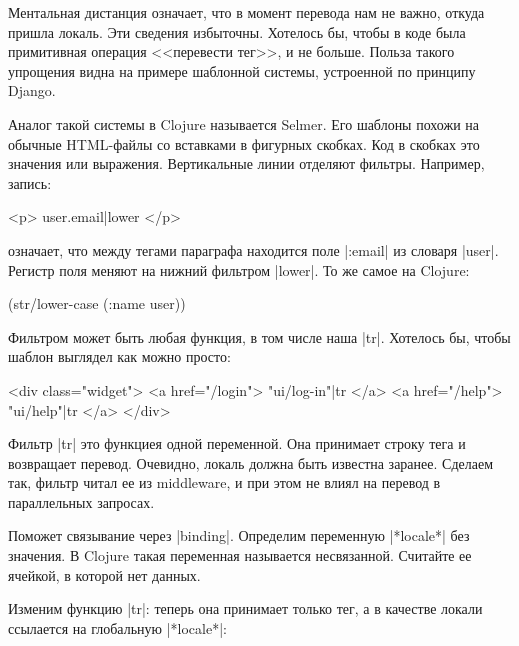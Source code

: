 Ментальная дистанция означает, что в момент перевода нам не важно, откуда пришла
локаль. Эти сведения избыточны. Хотелось бы, чтобы в коде была примитивная
операция <<перевести тег>>, и не больше. Польза такого упрощения видна на
примере шаблонной системы, устроенной по принципу
Django.

Аналог такой системы в Clojure называется
Selmer. Его шаблоны похожи на обычные
HTML-файлы со вставками в фигурных скобках. Код в скобках это значения или
выражения. Вертикальные линии отделяют фильтры. Например, запись:

\begin{english}
  \begin{htmldjango}
<p>{{ user.email|lower }}</p>
  \end{htmldjango}
\end{english}

\noindent
означает, что между тегами параграфа находится поле \spverb|:email| из словаря
\spverb|user|. Регистр поля меняют на нижний фильтром \spverb|lower|. То же
самое на Clojure:

\begin{english}
  \begin{clojure}
(str/lower-case (:name user))
  \end{clojure}
\end{english}

Фильтром может быть любая функция, в том числе наша \spverb|tr|. Хотелось бы,
чтобы шаблон выглядел как можно просто:

\begin{english}
  \begin{htmldjango}
<div class="widget">
  <a href="/login">{{ "ui/log-in"|tr }}</a>
  <a href="/help">{{ "ui/help"|tr }}</a>
</div>
  \end{htmldjango}
\end{english}

Фильтр \spverb|tr| это функциея одной переменной. Она принимает строку тега и
возвращает перевод. Очевидно, локаль должна быть известна заранее. Сделаем так,
фильтр читал ее из middleware, и при этом не влиял на перевод в параллельных
запросах.

Поможет связывание через \spverb|binding|. Определим переменную
\spverb|*locale*| без значения. В Clojure такая переменная называется
несвязанной. Считайте ее ячейкой, в которой нет данных.

Изменим функцию \spverb|tr|: теперь она принимает только тег, а в качестве
локали ссылается на глобальную \spverb|*locale*|:

